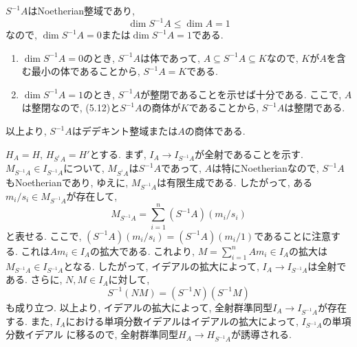 \documentclass[dvipdfmx]{jsarticle}
\begin{document}
    \begin{problem}
        $S^{-1}A$はNoetherian整域であり,
        \[
            \dim {S^{-1}A} \leq \dim{A} = 1
        \]
        なので, $\dim{S^{-1}A} = 0$または$\dim{S^{-1}A} = 1$である.
        \begin{enumerate}
            \item $\dim{S^{-1}A} = 0$のとき, $S^{-1}A$は体であって, $A \subseteq S^{-1}A \subseteq K$なので,
            $K$が$A$を含む最小の体であることから, $S^{-1}A = K$である.
            \item $\dim{S^{-1}A} = 1$のとき, $S^{-1}A$が整閉であることを示せば十分である.
            ここで, $A$は整閉なので, (5.12)と$S^{-1}A$の商体が$K$であることから, $S^{-1}A$は整閉である.
        \end{enumerate}
        以上より, $S^{-1}A$はデデキント整域または$A$の商体である.

        $H_A = H$, $H_{S^{^1}A}= H'$とする.
        まず, $I_A \to I_{S^{-1}A}$が全射であることを示す.
        $M_{S^{-1}A} \in I_{S^{-1}A}$について, $M_{S^{^1}A}$は$S^{-1}A$であって, $A$は特にNoetherianなので,
        $S^{-1}A$もNoetherianであり, ゆえに, $M_{S^{-1}A}$は有限生成である.
        したがって, ある$m_i/s_i \in M_{S^{-1}A}$が存在して,
        \[
            M_{S^{-1}A} = \sum_{i = 1}^n (S^{-1}A)(m_i/s_i)
        \]
        と表せる.
        ここで, $(S^{-1}A)(m_i/s_i) = (S^{-1}A)(m_i/1)$であることに注意する.
        これは$Am_i \in I_A$の拡大である.
        これより, $M = \sum_{i = 1}^n Am_i \in I_A$の拡大は$M_{S^{-1}A} \in I_{S^{-1}A}$となる.
        したがって, イデアルの拡大によって, $I_A \to I_{S^{-1}A}$は全射である.
        さらに, $N,M \in I_A$に対して,
        \[
            S^{-1}(NM) = (S^{-1}N)(S^{-1}M)
        \]
        も成り立つ.
        以上より, イデアルの拡大によって, 全射群準同型$I_A \to I_{S^{-1}A}$が存在する.
        また, $I_A$における単項分数イデアルはイデアルの拡大によって, $I_{S^{-1}A}$の単項分数イデアル
        に移るので, 全射群準同型$H_{A} \to H_{S^{-1}A}$が誘導される.
    \end{problem}
\end{document}
